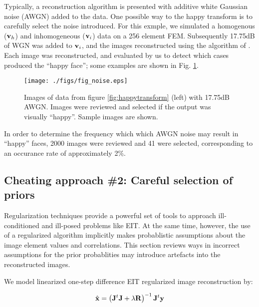 \documentclass[12pt]{iopart}
\begin{document}
Typically, a reconstruction algorithm is presented
with additive white Gaussian noise (AWGN) added to the data. One
possible way to the happy transform is to
carefully select the noise introduced.
For this exmple, we simulated a homogenous (${\bf v}_h$)
and inhomogeneous (${\bf v}_i$) data on a 256
element FEM. Subsequently 17.75dB of WGN was added to
${\bf v}_i$, and the images reconstructed using
the algorithm of \cite{Adler_and_Guardo_1996}.
Each image was reconstructed, and evaluated by us to
detect which cases produced the ``happy face'';
some examples are shown in Fig. \ref{fig:happynoise}.

%
%
\begin{figure}[th]
\begin{flushright}
\texttt{[image: ./figs/fig\_noise.eps]}
\caption{\small 
Images of data from figure \ref{fig:happytransform} (left)
with 17.75dB AWGN. Images were reviewed and selected if
the output was visually ``happy''. Sample images are shown.
 }
 \label{fig:happynoise}
\end{flushright}
\end{figure}

In order to determine the frequency which which AWGN noise
may result in ``happy'' faces, 2000
images were reviewed and 41 were selected, corresponding
to an occurance rate of approximately 2\%.

\subsection{ Cheating approach \#2:
             Careful selection of priors}

Regularization techniques provide a powerful set of tools
to approach ill-conditioned and ill-posed problems like
EIT. At the same time, however, the use of a regularized
algorithm implicitly makes probablistic assumptions
about the image element values and correlations. 
This section reviews ways in incorrect assumptions for
the prior probablities may introduce artefacts into 
the reconstructed images.

We model linearized one-step difference
EIT regularized image reconstruction
by:

\begin{equation}
   \hat{\bf x} = 
   \left({\bf J}^t{\bf J} + \lambda{\bf R}\right)^{-1}
         {\bf J}^t{\bf y}
\end{equation}
\end{document}
